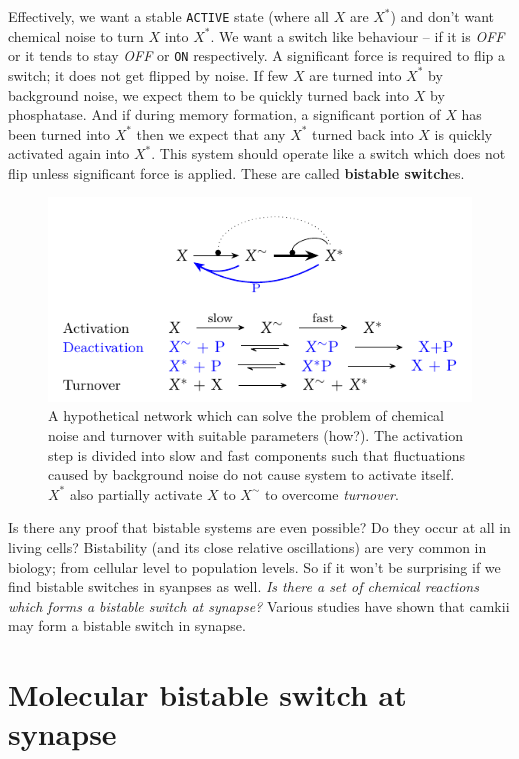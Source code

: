 \documentclass[]{resonance}
\begin{document}
Effectively, we want a stable \texttt{ACTIVE} state (where all $X$ are $X^*$)
and don't want chemical noise to turn $X$ into $X^*$. We want a switch like
behaviour -- if it is \textit{OFF} or  it tends to stay \textit{OFF} or
\texttt{ON} respectively. A significant force is required to flip a switch; it
does not get flipped by noise. If few $X$ are turned into $X^*$ by background
noise, we expect them to be quickly turned back into $X$ by phosphatase. And if
during memory formation, a significant portion of $X$ has been turned into $X^*$
then we expect that any $X^*$ turned back into $X$ is quickly activated again
into $X^*$.  This system should operate like a switch which does not flip unless
significant force is applied. These are called \textbf{bistable switch}es. 

\begin{figure}[t!]
\centering
\includegraphics[width=\linewidth]{./fig_model_b.pdf}
\caption{A hypothetical network which can solve the problem of chemical noise and
    turnover with suitable parameters (how?). The activation step is divided into slow and fast
    components such that fluctuations caused by background noise do not cause system to 
    activate itself. $X^*$ also partially activate $X$ to $X^\sim$ to overcome \textit{turnover}. 
}\label{fig:model_bistable}
\end{figure}

Is there any  proof that bistable systems are even possible? Do they occur at
all in living cells?  Bistability (and its close relative oscillations) are very
common in biology; from cellular level to population levels. So if it won't be
surprising if we find bistable switches in syanpses as well.  \emph{Is there a set
of chemical reactions which forms a bistable switch at synapse?} Various studies
have shown that \gls{camkii} may form a bistable switch in synapse.

\section{Molecular bistable switch at synapse}\label{sec:molecular_switch}
\end{document}
